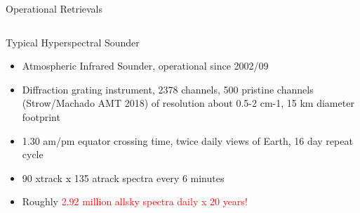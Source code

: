 \documentclass[10pt,t]{beamer}
\begin{document}

\begin{frame}[shrink=2]{Operational Retrievals}
\vspace{-0.11in}
\begin{columns}

\begin{column}{0.55\columnwidth}
\begin{block}{Typical Hyperspectral Sounder}
  \begin{itemize}
  \item Atmospheric Infrared Sounder, operational since 2002/09
  \item Diffraction grating instrument, 2378 channels, 500 pristine channels 
        (Strow/Machado AMT 2018) of resolution about 0.5-2 cm-1, 15 km diameter footprint
  \item 1.30 am/pm equator crossing time, twice daily views of Earth, 16 day repeat cycle
  \item 90 xtrack x 135 atrack spectra every 6 minutes
  \item Roughly \textcolor{red}{2.92 million  allsky spectra daily x 20 years!}
  \end{itemize}
\end{block}
\end{column}


\end{columns}
\end{frame}
\end{document}
